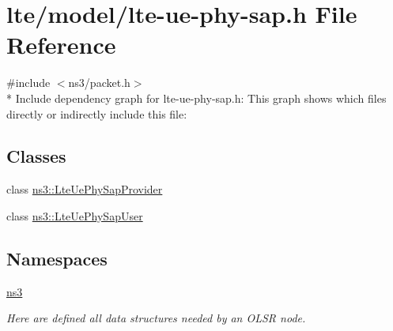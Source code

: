 \hypertarget{lte-ue-phy-sap_8h}{}\section{lte/model/lte-\/ue-\/phy-\/sap.h File Reference}
\label{lte-ue-phy-sap_8h}
{\ttfamily \#include $<$ns3/packet.\+h$>$}\\*
Include dependency graph for lte-\/ue-\/phy-\/sap.h\+:
This graph shows which files directly or indirectly include this file\+:
\subsection*{Classes}
\begin{DoxyCompactItemize}
\item 
class \hyperlink{classns3_1_1LteUePhySapProvider}{ns3\+::\+Lte\+Ue\+Phy\+Sap\+Provider}
\item 
class \hyperlink{classns3_1_1LteUePhySapUser}{ns3\+::\+Lte\+Ue\+Phy\+Sap\+User}
\end{DoxyCompactItemize}
\subsection*{Namespaces}
\begin{DoxyCompactItemize}
\item 
 \hyperlink{namespacens3}{ns3}
\begin{DoxyCompactList}\small\item\em Here are defined all data structures needed by an O\+L\+SR node. \end{DoxyCompactList}\end{DoxyCompactItemize}
